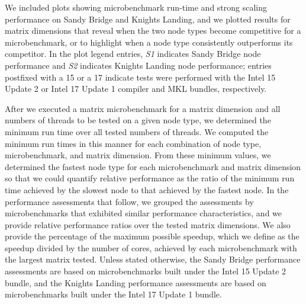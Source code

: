 We included plots showing microbenchmark run-time and strong scaling performance
  on Sandy Bridge and Knights Landing, and we plotted results for
  matrix dimensions that reveal when the two node types become competitive for
  a microbenchmark, or to highlight when a node type consistently outperforms
  its competitor.
In the plot legend entries, \textit{S1} indicates Sandy Bridge node performance
  and \textit{S2} indicates Knights Landing node performance; entries postfixed
  with a 15 or a 17 indicate tests were performed with the Intel 15 Update 2 or
  Intel 17 Update 1 compiler and MKL bundles, respectively.

After we executed a matrix microbenchmark for a matrix dimension and all numbers
  of threads to be tested on a given node type, we determined the minimum run
  time over all tested numbers of threads.
We computed the minimum run times in this manner for each combination of node
  type, microbenchmark, and matrix dimension.
From these minimum values, we determined the fastest node type for each
  microbenchmark and matrix dimension so that we could quantify relative
  performance as the ratio of the minimum run time achieved by the slowest node
  to that achieved by the fastest node.
In the performance assessments that follow, we grouped the assessments by microbenchmarks
  that exhibited similar performance characteristics, and we provide relative performance
  ratios over the tested matrix dimensions.
We also provide the percentage of the maximum possible speedup, which we define
  as the speedup divided by the number of cores, achieved by each microbenchmark
  with the largest matrix tested.
Unless stated otherwise, the Sandy Bridge performance assessments are based on
  microbenchmarks built under the Intel 15 Update 2 bundle, and the Knights
  Landing performance assessments are based on microbenchmarks built under the
  Intel 17 Update 1 bundle.

